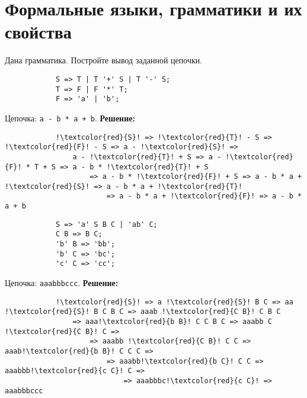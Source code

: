 \documentclass[]{article}
\begin{document}
\section{Формальные языки, грамматики и их свойства}

\begin{enumerate}

\begin{item}
    Дана грамматика. Постройте вывод заданной цепочки.
    \begin{enumerate}
    
    \begin{item}
        \begin{lstlisting}
            S => T | T '+' S | T '-' S;
            T => F | F '*' T;
            F => 'a' | 'b';
        \end{lstlisting}
        Цепочка: \lstinline|a - b * a + b|.
        \bigbreak
        \textbf{Решение:}
        \begin{lstlisting}
            !\textcolor{red}{S}! => !\textcolor{red}{T}! - S => !\textcolor{red}{F}! - S => a - !\textcolor{red}{S}! =>
                a - !\textcolor{red}{T}! + S => a - !\textcolor{red}{F}! * T + S => a - b * !\textcolor{red}{T}! + S
                    => a - b * !\textcolor{red}{F}! + S => a - b * a + !\textcolor{red}{S}! => a - b * a + !\textcolor{red}{T}!
                        => a - b * a + !\textcolor{red}{F}! => a - b * a + b
        \end{lstlisting}
    \end{item}
    
    \begin{item}
        \begin{lstlisting}
            S => 'a' S B C | 'ab' C;
            C B => B C;
            'b' B => 'bb';
            'b' C => 'bc';
            'c' C => 'cc';
        \end{lstlisting}
        Цепочка: \lstinline|aaabbbccc|.
        \bigbreak
        \textbf{Решение:}
        \begin{lstlisting}
            !\textcolor{red}{S}! => a !\textcolor{red}{S}! B C => aa !\textcolor{red}{S}! B C B C => aaab !\textcolor{red}{C B}! C B C
                => aaa!\textcolor{red}{b B}! C C B C => aaabb C !\textcolor{red}{C B}! C =>
                    => aaabb !\textcolor{red}{C B}! C C => aaab!\textcolor{red}{b B}! C C C =>
                        => aaabb!\textcolor{red}{b C}! C C => aaabbb!\textcolor{red}{c C}! C =>
                            => aaabbbc!\textcolor{red}{c C}! => aaabbbccc
        \end{lstlisting}
    \end{item}
    

\end{enumerate}
\end{item}
\end{enumerate}
\end{document}
